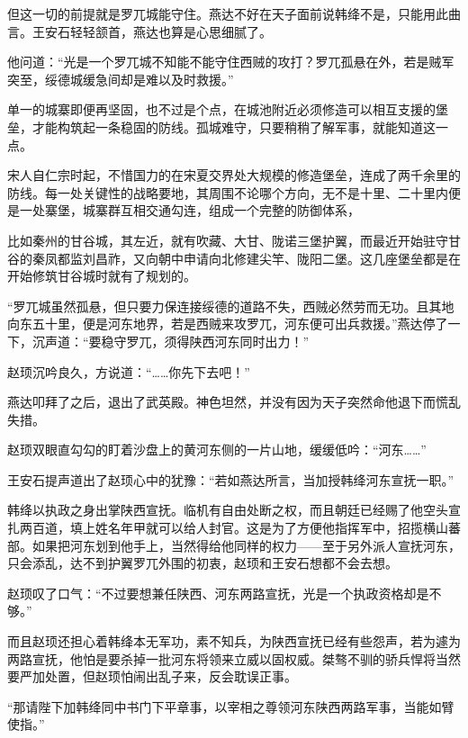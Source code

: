 但这一切的前提就是罗兀城能守住。燕达不好在天子面前说韩绛不是，只能用此曲言。王安石轻轻颔首，燕达也算是心思细腻了。

他问道：“光是一个罗兀城不知能不能守住西贼的攻打？罗兀孤悬在外，若是贼军突至，绥德城缓急间却是难以及时救援。”

单一的城寨即便再坚固，也不过是个点，在城池附近必须修造可以相互支援的堡垒，才能构筑起一条稳固的防线。孤城难守，只要稍稍了解军事，就能知道这一点。

宋人自仁宗时起，不惜国力的在宋夏交界处大规模的修造堡垒，连成了两千余里的防线。每一处关键性的战略要地，其周围不论哪个方向，无不是十里、二十里内便是一处寨堡，城寨群互相交通勾连，组成一个完整的防御体系，

比如秦州的甘谷城，其左近，就有吹藏、大甘、陇诺三堡护翼，而最近开始驻守甘谷的秦凤都监刘昌祚，又向朝中申请向北修建尖竿、陇阳二堡。这几座堡垒都是在开始修筑甘谷城时就有了规划的。

“罗兀城虽然孤悬，但只要力保连接绥德的道路不失，西贼必然劳而无功。且其地向东五十里，便是河东地界，若是西贼来攻罗兀，河东便可出兵救援。”燕达停了一下，沉声道：“要稳守罗兀，须得陕西河东同时出力！”

赵顼沉吟良久，方说道：“……你先下去吧！”

燕达叩拜了之后，退出了武英殿。神色坦然，并没有因为天子突然命他退下而慌乱失措。

赵顼双眼直勾勾的盯着沙盘上的黄河东侧的一片山地，缓缓低吟：“河东……”

王安石提声道出了赵顼心中的犹豫：“若如燕达所言，当加授韩绛河东宣抚一职。”

韩绛以执政之身出掌陕西宣抚。临机有自由处断之权，而且朝廷已经赐了他空头宣扎两百道，填上姓名年甲就可以给人封官。这是为了方便他指挥军中，招揽横山蕃部。如果把河东划到他手上，当然得给他同样的权力——至于另外派人宣抚河东，只会添乱，达不到护翼罗兀外围的初衷，赵顼和王安石想都不会去想。

赵顼叹了口气：“不过要想兼任陕西、河东两路宣抚，光是一个执政资格却是不够。”

而且赵顼还担心着韩绛本无军功，素不知兵，为陕西宣抚已经有些怨声，若为遽为两路宣抚，他怕是要杀掉一批河东将领来立威以固权威。桀骜不驯的骄兵悍将当然要严加处置，但赵顼怕闹出乱子来，反会耽误正事。

“那请陛下加韩绛同中书门下平章事，以宰相之尊领河东陕西两路军事，当能如臂使指。”

